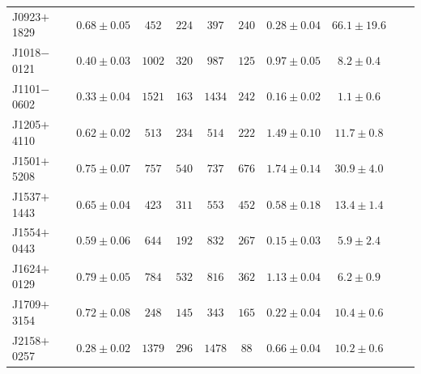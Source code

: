 \documentclass{aa}
\begin{document}
\begin{table}
\begin{tabular}{lccccccccc}
J0923$+$1829 &             $0.68 \pm 0.05$ &             $452$ &             $224$ &             $397$ &             $240$ &            $0.28 \pm 0.04$ &             $66.1 \pm 19.6$ & \\ 
J1018$-$0121 &             $0.40 \pm 0.03$ &             $1002$ &             $320$ &             $987$ &             $125$ &            $0.97 \pm 0.05$ &             $8.2 \pm 0.4$ & \\ 
J1101$-$0602 &             $0.33 \pm 0.04$ &             $1521$ &             $163$ &             $1434$ &             $242$ &            $0.16 \pm 0.02$ &             $1.1 \pm 0.6$ & \\ 
J1205$+$4110 &             $0.62 \pm 0.02$ &             $513$ &             $234$ &             $514$ &             $222$ &            $1.49 \pm 0.10$ &             $11.7 \pm 0.8$ & \\ 
J1501$+$5208 &             $0.75 \pm 0.07$ &             $757$ &             $540$ &             $737$ &             $676$ &            $1.74 \pm 0.14$ &             $30.9 \pm 4.0$ & \\ 
J1537$+$1443 &             $0.65 \pm 0.04$ &             $423$ &             $311$ &             $553$ &             $452$ &            $0.58 \pm 0.18$ &             $13.4 \pm 1.4$ & \\ 
J1554$+$0443 &             $0.59 \pm 0.06$ &             $644$ &             $192$ &             $832$ &             $267$ &            $0.15 \pm 0.03$ &             $5.9 \pm 2.4$ & \\ 
J1624$+$0129 &             $0.79 \pm 0.05$ &             $784$ &             $532$ &             $816$ &             $362$ &            $1.13 \pm 0.04$ &             $6.2 \pm 0.9$ & \\ 
J1709$+$3154 &             $0.72 \pm 0.08$ &             $248$ &             $145$ &             $343$ &             $165$ &            $0.22 \pm 0.04$ &             $10.4 \pm 0.6$ & \\ 
J2158$+$0257 &             $0.28 \pm 0.02$ &             $1379$ &             $296$ &             $1478$ &             $88$ &            $0.66 \pm 0.04$ &             $10.2 \pm 0.6$ & \\ 
\hline

\end{tabular}
\endgroup
\end{table}
\end{document}
